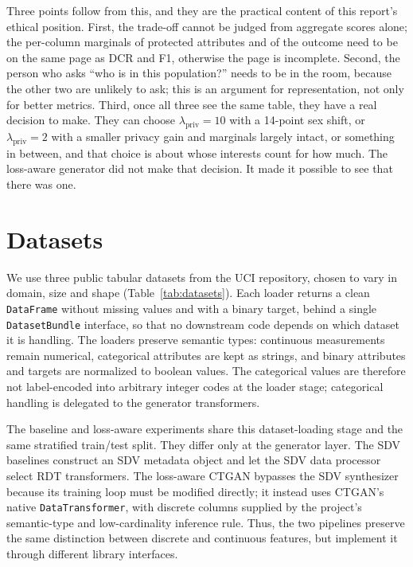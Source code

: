 \documentclass[11pt,a4paper]{article}
\newcommand{\lpriv}{\lambda_{\text{priv}}}
\begin{document}
Three points follow from this, and they are the practical content of this
report's ethical position. First, the trade-off cannot be judged from
aggregate scores alone; the per-column marginals of protected attributes and
of the outcome need to be on the same page as DCR and F1, otherwise the page
is incomplete. Second, the person who asks ``who is in this population?''
needs to be in the room, because the other two are unlikely to ask; this is an
argument for representation, not only for better metrics. Third, once all
three see the same table, they have a real decision to make. They can choose
$\lpriv = 10$ with a 14-point sex shift, or $\lpriv = 2$ with a smaller
privacy gain and marginals largely intact, or something in between, and that
choice is about whose interests count for how much. The loss-aware generator
did not make that decision. It made it possible to see that there was one.

\section{Datasets}
\label{sec:datasets}

We use three public tabular datasets from the UCI repository, chosen to vary
in domain, size and shape (Table~\ref{tab:datasets}). Each loader returns a
clean \texttt{DataFrame} without missing values and with a binary target,
behind a single \texttt{DatasetBundle} interface, so that no downstream code
depends on which dataset it is handling. The loaders preserve semantic types:
continuous measurements remain numerical, categorical attributes are kept as
strings, and binary attributes and targets are normalized to boolean values.
The categorical values are therefore not label-encoded into arbitrary integer
codes at the loader stage; categorical handling is delegated to the generator
transformers.

The baseline and loss-aware experiments share this dataset-loading stage and
the same stratified train/test split. They differ only at the generator layer.
The SDV baselines construct an SDV metadata object and let the SDV data
processor select RDT transformers. The loss-aware CTGAN bypasses the SDV
synthesizer because its training loop must be modified directly; it instead
uses CTGAN's native \texttt{DataTransformer}, with discrete columns supplied
by the project's semantic-type and low-cardinality inference rule. Thus, the
two pipelines preserve the same distinction between discrete and continuous
features, but implement it through different library interfaces.
\end{document}

